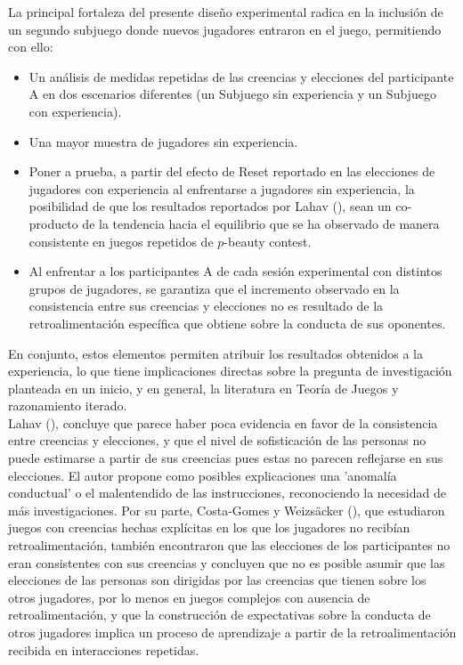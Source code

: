 La principal fortaleza del presente diseño experimental radica en la inclusión de un segundo subjuego donde nuevos jugadores entraron en el juego, permitiendo con ello:

\begin{itemize}
\item Un análisis de medidas repetidas de las creencias y elecciones del participante A en dos escenarios diferentes (un Subjuego sin experiencia y un Subjuego con experiencia).

\item Una mayor muestra de jugadores sin experiencia.

\item Poner a prueba, a partir del efecto de Reset reportado en las elecciones de jugadores con experiencia al enfrentarse a jugadores sin experiencia, la posibilidad de que los resultados reportados por Lahav (\citeyear{Lahav}), sean un co-producto de la tendencia hacia el equilibrio que se ha observado de manera consistente en juegos repetidos de $p$-beauty contest.

\item Al enfrentar a los participantes A de cada sesión experimental con distintos grupos de jugadores, se garantiza que el incremento observado en la consistencia entre sus creencias y elecciones no es resultado de la retroalimentación específica que obtiene sobre la conducta de sus oponentes.
\end{itemize}

En conjunto, estos elementos permiten atribuir los resultados obtenidos a la experiencia, lo que tiene implicaciones directas sobre la pregunta de investigación planteada en un inicio, y en general, la literatura en Teoría de Juegos y razonamiento iterado.\\

Lahav (\citeyear{Lahav}), concluye que parece haber poca evidencia en favor de la consistencia entre creencias y elecciones, y que el nivel de sofisticación de las personas no puede estimarse a partir de sus creencias pues estas no parecen reflejarse en sus elecciones. El autor propone como posibles explicaciones una 'anomalía conductual' o el malentendido de las instrucciones, reconociendo la necesidad de más investigaciones. Por su parte, Costa-Gomes y Weizsäcker (\citeyear{Costa-Gomes}), que estudiaron juegos con creencias hechas explícitas en los que los jugadores no recibían retroalimentación, también encontraron que las elecciones de los participantes no eran consistentes con sus creencias y concluyen que no es posible asumir que las elecciones de las personas son dirigidas por las creencias que tienen sobre los otros jugadores, por lo menos en juegos complejos con ausencia de retroalimentación, y que la construcción de expectativas sobre la conducta de otros jugadores implica un proceso de aprendizaje a partir de la retroalimentación recibida en interacciones repetidas.\\

